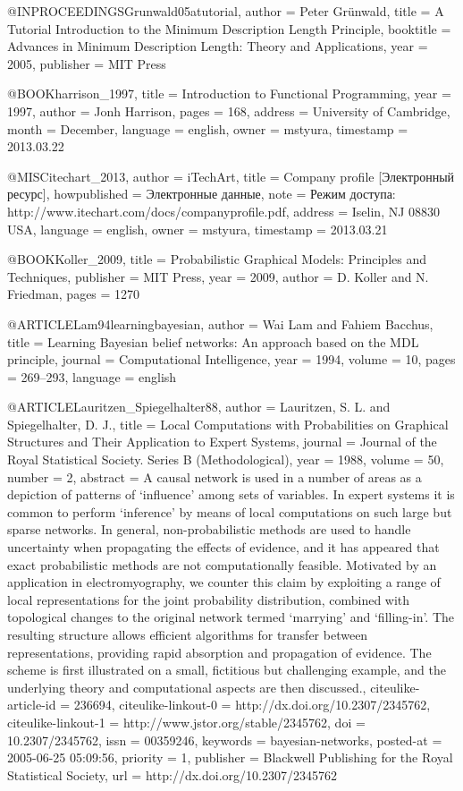 @INPROCEEDINGS{Grunwald05atutorial,
  author = {Peter Grünwald},
  title = {A Tutorial Introduction to the Minimum Description Length Principle},
  booktitle = {Advances in Minimum Description Length: Theory and Applications},
  year = {2005},
  publisher = {MIT Press}
}

@BOOK{harrison_1997,
  title = {Introduction to Functional Programming},
  year = {1997},
  author = {Jonh Harrison},
  pages = {168},
  address = {University of Cambridge},
  month = {December},
  language = {english},
  owner = {mstyura},
  timestamp = {2013.03.22}
}

@MISC{itechart_2013,
  author = {iTechArt},
  title = {Company profile [Электронный ресурс]},
  howpublished = {Электронные данные},
  note = {Режим доступа: http://www.itechart.com/docs/companyprofile.pdf},
  address = {Iselin, NJ 08830 USA},
  language = {english},
  owner = {mstyura},
  timestamp = {2013.03.21}
}

@BOOK{Koller_2009,
  title = {Probabilistic Graphical Models: Principles and Techniques},
  publisher = {MIT Press},
  year = {2009},
  author = {D. Koller and N. Friedman},
  pages = {1270}
}

@ARTICLE{Lam94learningbayesian,
  author = {Wai Lam and Fahiem Bacchus},
  title = {Learning Bayesian belief networks: An approach based on the MDL principle},
  journal = {Computational Intelligence},
  year = {1994},
  volume = {10},
  pages = {269--293},
  language = {english}
}

@ARTICLE{Lauritzen_Spiegelhalter88,
  author = {Lauritzen, S. L. and Spiegelhalter, D. J.},
  title = {{Local Computations with Probabilities on Graphical Structures and
	Their Application to Expert Systems}},
  journal = {Journal of the Royal Statistical Society. Series B (Methodological)},
  year = {1988},
  volume = {50},
  number = {2},
  abstract = {{A causal network is used in a number of areas as a depiction of patterns
	of `influence' among sets of variables. In expert systems it is common
	to perform `inference' by means of local computations on such large
	but sparse networks. In general, non-probabilistic methods are used
	to handle uncertainty when propagating the effects of evidence, and
	it has appeared that exact probabilistic methods are not computationally
	feasible. Motivated by an application in electromyography, we counter
	this claim by exploiting a range of local representations for the
	joint probability distribution, combined with topological changes
	to the original network termed `marrying' and `filling-in'. The resulting
	structure allows efficient algorithms for transfer between representations,
	providing rapid absorption and propagation of evidence. The scheme
	is first illustrated on a small, fictitious but challenging example,
	and the underlying theory and computational aspects are then discussed.}},
  citeulike-article-id = {236694},
  citeulike-linkout-0 = {http://dx.doi.org/10.2307/2345762},
  citeulike-linkout-1 = {http://www.jstor.org/stable/2345762},
  doi = {10.2307/2345762},
  issn = {00359246},
  keywords = {bayesian-networks},
  posted-at = {2005-06-25 05:09:56},
  priority = {1},
  publisher = {Blackwell Publishing for the Royal Statistical Society},
  url = {http://dx.doi.org/10.2307/2345762}
}

